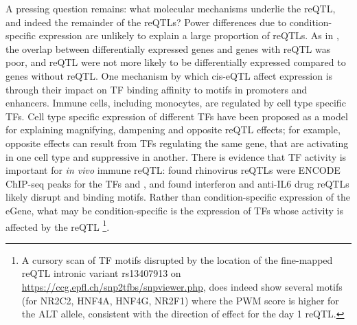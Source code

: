 
A pressing question remains: what molecular mechanisms underlie the  \gls{reQTL}, and indeed the remainder of the \glspl{reQTL}?
Power differences due to condition-specific expression are unlikely to explain a large proportion of reQTLs.
As in \autocite{kim-hellmuth2017GeneticRegulatoryEffects, davenport2018DiscoveringVivoCytokineeQTL}, the overlap between differentially expressed genes and genes with reQTL was poor,
and reQTL were not more likely to be differentially expressed compared to genes without reQTL.
One mechanism by which cis-eQTL affect expression is through their impact on \gls{TF} binding affinity to motifs in promoters and enhancers\autocite{pai2015GeneticMechanisticBasis}.
Immune cells, including monocytes, are regulated by cell type specific \glspl{TF}\autocite{choudhury2016IdentifyingCellTypeSpecific}.
Cell type specific expression of different \glspl{TF} have been proposed as a model for explaining magnifying, dampening and opposite reQTL effects;
for example, opposite effects can result from \glspl{TF} regulating the same gene, that are activating in one cell type and suppressive in another\autocite{fu2012UnravelingRegulatoryMechanisms}.
There is evidence that \gls{TF} activity is important for \textit{in vivo} immune reQTL:
\autocite{caliskan2015HostGeneticVariation} found rhinovirus reQTLs were ENCODE ChIP-seq peaks for the \glspl{TF}  and ,
and \autocite{davenport2018DiscoveringVivoCytokineeQTL} found interferon and anti-IL6 drug reQTLs likely disrupt  and  binding motifs.
Rather than condition-specific expression of the eGene, what may be condition-specific is the expression of \glspl{TF} whose activity is affected by the reQTL%
\footnote{
    A cursory scan of \gls{TF} motifs disrupted by the location of the fine-mapped  reQTL intronic variant rs13407913 on \url{https://ccg.epfl.ch/snp2tfbs/snpviewer.php},
    does indeed show several motifs (for NR2C2, HNF4A, HNF4G, NR2F1)
    where the PWM score is higher for the ALT allele, 
    consistent with the direction of effect for the day 1 reQTL.
}.

